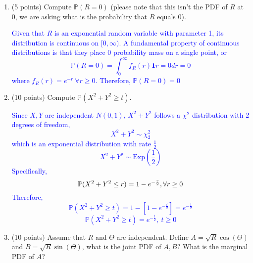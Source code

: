 \documentclass{article}
\begin{document}
\begin{enumerate}[label=(\alph*)]
    \item (5 points) Compute $\mathbb{P}(R = 0)$ (please note that this isn’t the PDF of $R$ at 0, we are asking what is the probability that $R$ equals 0).
    
        \textcolor{blue}{Given that $R$ is an exponential random variable with parameter 1, its distribution is continuous on $[0,\infty)$. A fundamental property of continuous distributions is that they place 0 probability mass on a single point, or 
        $$\mathbb{P}(R=0)=\int_{0}^{\infty}f_R(r)\mathbf{1}{r=0}dr=0$$ where $f_R(r)=e^{-r} \ \forall r \geq 0$.
        Therefore, $\mathbb{P}(R=0)=0$}

    \item (10 points) Compute $\mathbb{P}(X^2 + Y^2 \geq t)$.

        \textcolor{blue}{Since $X,Y$ are independent $N(0,1)$, $X^2+Y^2$ follows a $\chi^2$ distribution with 2 degrees of freedom, 
            $$X^2 + Y^2 \sim \chi_{2}^2$$
            which is an exponential distribution with rate $\frac{1}{2}$
            $$X^2 + Y^2 \sim \text{Exp}\left(\frac{1}{2}\right)$$
            Specifically,
            $$\mathbb{P}(X^2+Y^2 \leq r)=1-e^{-\frac{r}{2}}, \\ \forall r \geq 0$$
            Therefore, 
            $$\mathbb{P}(X^2+Y^2 \geq t)=1-[1-e^{-\frac{t}{2}}]=e^{-\frac{t}{2}}$$
        $$\mathbb{P}(X^2+Y^2 \geq t)=e^{-\frac{t}{2}}, \ t \geq 0$$}

    \item (10 points) Assume that $R$ and $\Theta$ are independent. Define $A = \sqrt{R}\cos(\Theta)$ and $B = \sqrt{R}\sin(\Theta)$, what is the joint PDF of $A, B$? What is the marginal PDF of $A$?


\end{enumerate}
\end{document}
